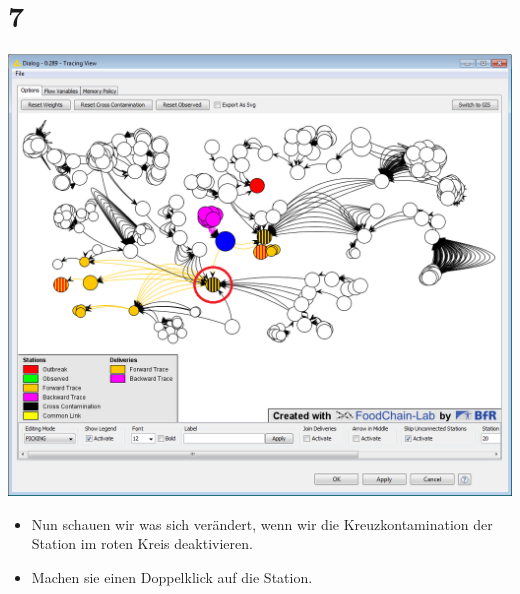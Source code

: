 \documentclass{beamer}
\begin{document}
\section{7}
\begin{frame}
	\begin{center}
  		\includegraphics[height=0.6\textheight]{7.png}
	\end{center}
	\begin{itemize}
		\item Nun schauen wir was sich verändert, wenn wir die Kreuzkontamination der Station im roten Kreis deaktivieren.
		\item Machen sie einen Doppelklick auf die Station.
	\end{itemize}
\end{frame}
\end{document}
